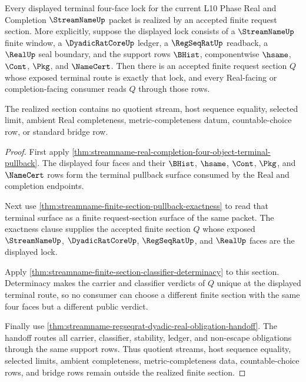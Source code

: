 \begin{theorem}
\label{thm:streamname-finite-section-surjects-real-regseq-dyadic-lock}
Every displayed terminal four-face lock for the current L10 Phase Real and
Completion $\StreamNameUp$ packet is realized by an accepted finite request
section. More explicitly, suppose the displayed lock consists of a
$\StreamNameUp$ finite window, a $\DyadicRatCoreUp$ ledger, a $\RegSeqRatUp$
readback, a $\RealUp$ seal boundary, and the support rows $\BHist$,
componentwise $\hsame$, $\Cont$, $\Pkg$, and $\NameCert$. Then there is an
accepted finite request section $Q$ whose exposed terminal route is exactly
that lock, and every Real-facing or completion-facing consumer reads $Q$
through those rows.

The realized section contains no quotient stream, host sequence equality,
selected limit, ambient Real completeness, metric-completeness datum,
countable-choice row, or standard bridge row.
\end{theorem}
\begin{proof}
First apply
\autoref{thm:streamname-real-completion-four-object-terminal-pullback}. The
displayed four faces and their $\BHist$, $\hsame$, $\Cont$, $\Pkg$, and
$\NameCert$ rows form the terminal pullback surface consumed by the Real and
completion endpoints.

Next use \autoref{thm:streamname-finite-section-pullback-exactness} to read
that terminal surface as a finite request-section surface of the same packet.
The exactness clause supplies the accepted finite section $Q$ whose exposed
$\StreamNameUp$, $\DyadicRatCoreUp$, $\RegSeqRatUp$, and $\RealUp$ faces are
the displayed lock.

Apply \autoref{thm:streamname-finite-section-classifier-determinacy} to this
section. Determinacy makes the carrier and classifier verdicts of $Q$ unique
at the displayed terminal route, so no consumer can choose a different finite
section with the same four faces but a different public verdict.

Finally use
\autoref{thm:streamname-regseqrat-dyadic-real-obligation-handoff}. The handoff
routes all carrier, classifier, stability, ledger, and non-escape obligations
through the same support rows. Thus quotient streams, host sequence equality,
selected limits, ambient completeness, metric-completeness data,
countable-choice rows, and bridge rows remain outside the realized finite
section.
\end{proof}

